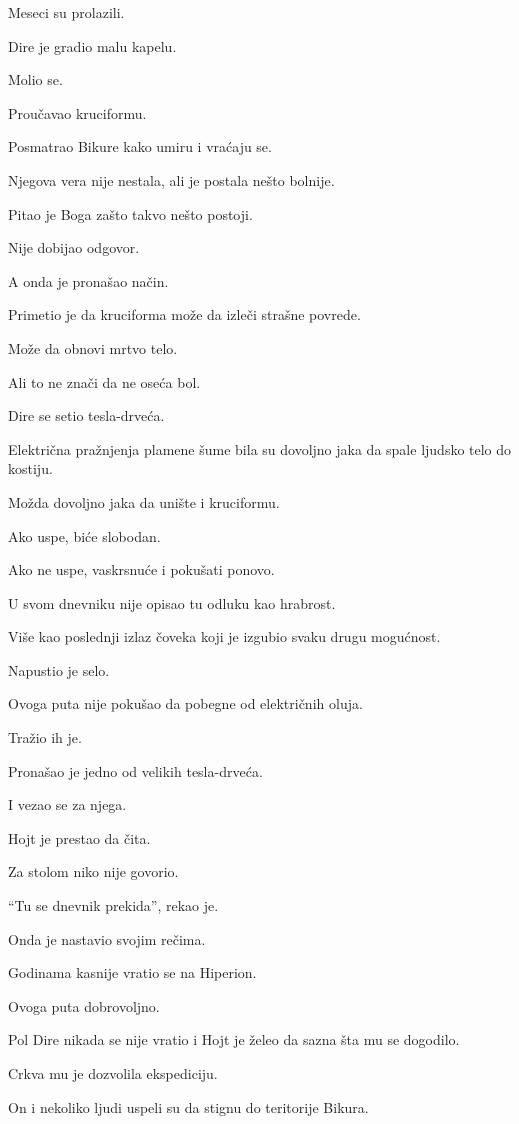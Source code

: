 Meseci su prolazili.

Dire je gradio malu kapelu.

Molio se.

Proučavao kruciformu.

Posmatrao Bikure kako umiru i vraćaju se.

Njegova vera nije nestala, ali je postala nešto bolnije.

Pitao je Boga zašto takvo nešto postoji.

Nije dobijao odgovor.

A onda je pronašao način.

Primetio je da kruciforma može da izleči strašne povrede.

Može da obnovi mrtvo telo.

Ali to ne znači da ne oseća bol.

Dire se setio tesla-drveća.

Električna pražnjenja plamene šume bila su dovoljno jaka da spale ljudsko telo do kostiju.

Možda dovoljno jaka da unište i kruciformu.

Ako uspe, biće slobodan.

Ako ne uspe, vaskrsnuće i pokušati ponovo.

U svom dnevniku nije opisao tu odluku kao hrabrost.

Više kao poslednji izlaz čoveka koji je izgubio svaku drugu mogućnost.

Napustio je selo.

Ovoga puta nije pokušao da pobegne od električnih oluja.

Tražio ih je.

Pronašao je jedno od velikih tesla-drveća.

I vezao se za njega.

\bigskip

Hojt je prestao da čita.

Za stolom niko nije govorio.

``Tu se dnevnik prekida'', rekao je.

Onda je nastavio svojim rečima.

Godinama kasnije vratio se na Hiperion.

Ovoga puta dobrovoljno.

Pol Dire nikada se nije vratio i Hojt je želeo da sazna šta mu se dogodilo.

Crkva mu je dozvolila ekspediciju.

On i nekoliko ljudi uspeli su da stignu do teritorije Bikura.


